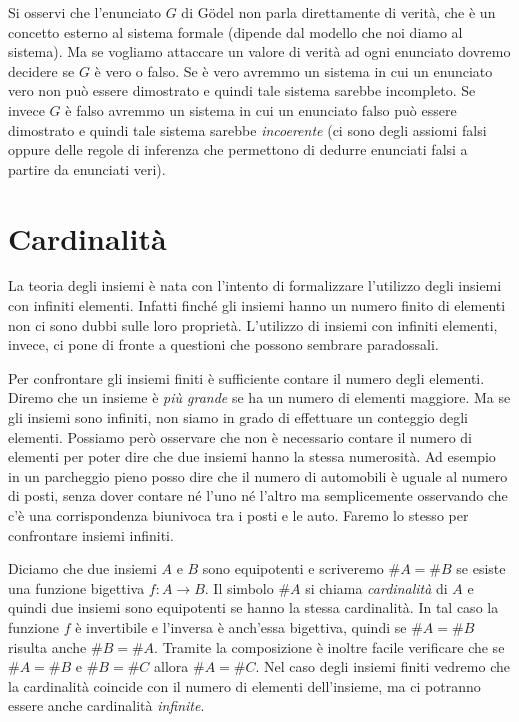 \documentclass[italian,a4paper,hidelinks,headinclude]{scrartcl}
\newcommand{\myemph}[1]{\emph{#1}\marginpar{#1}}
\begin{document}
Si osservi che l'enunciato $G$ di G\"odel non parla direttamente di verità,
che è un concetto esterno al sistema formale
(dipende dal modello che noi diamo al sistema).
Ma se vogliamo attaccare un valore di verità ad ogni enunciato dovremo decidere
se $G$ è vero o falso. Se è vero avremmo un sistema in cui un enunciato vero
non può essere dimostrato e quindi tale sistema sarebbe incompleto.
Se invece $G$ è falso avremmo un sistema in cui un enunciato falso può essere
dimostrato e quindi tale sistema sarebbe \myemph{incoerente} (ci sono degli assiomi
falsi oppure delle regole di inferenza che permettono di dedurre enunciati falsi
a partire da enunciati veri).

\section{Cardinalità}

La teoria degli insiemi è nata con l'intento di formalizzare l'utilizzo degli
insiemi con infiniti elementi. Infatti finché gli insiemi hanno un numero finito
di elementi non ci sono dubbi sulle loro proprietà. L'utilizzo di insiemi con
infiniti elementi, invece, ci pone di fronte a questioni che possono sembrare
paradossali.

Per confrontare gli insiemi finiti è sufficiente contare il numero degli elementi.
Diremo che un insieme è \emph{più grande} se ha un numero di elementi maggiore.
Ma se gli insiemi sono infiniti, non siamo in grado di effettuare un conteggio
degli elementi. Possiamo però osservare che non è necessario contare il numero
di elementi per poter dire che due insiemi hanno la stessa numerosità.
Ad esempio in un parcheggio pieno posso dire che il numero di automobili
è uguale al numero di posti, senza dover contare né l'uno né l'altro ma semplicemente
osservando che c'è una corrispondenza biunivoca tra i posti e le auto. Faremo
lo stesso per confrontare insiemi infiniti.

Diciamo che due insiemi $A$ e $B$ sono equipotenti e scriveremo $\#A = \#B$
se esiste una funzione bigettiva $f\colon A \to B$.
Il simbolo $\#A$ si chiama \myemph{cardinalità} di $A$ e quindi due insiemi
sono equipotenti se hanno la stessa cardinalità.
In tal caso la funzione
$f$ è invertibile e l'inversa è anch'essa bigettiva,
quindi se $\#A = \#B$ risulta anche $\#B = \#A$.
Tramite la composizione è inoltre facile verificare che se $\#A = \#B$ e $\#B = \#C$
allora $\#A = \#C$.
Nel caso degli insiemi finiti vedremo che la cardinalità coincide con il
numero di elementi dell'insieme, ma ci potranno essere anche cardinalità
\emph{infinite}.
\end{document}
